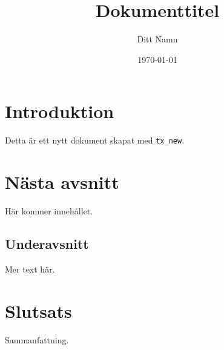 

\title{Dokumenttitel}
\author{Ditt Namn}
\date{\today}



\maketitle
\tableofcontents
\newpage

\section{Introduktion}

Detta är ett nytt dokument skapat med \texttt{tx\_new}.

\section{Nästa avsnitt}

Här kommer innehållet.

\subsection{Underavsnitt}

Mer text här.

\section{Slutsats}

Sammanfattning.


